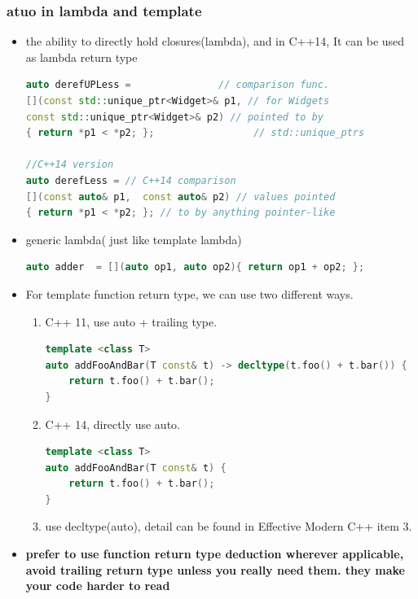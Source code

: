 \documentclass[a4paper,12pt,twoside]{book}
\begin{document}
\subsubsection{atuo in lambda and template}
\begin{itemize}
	\item the ability to directly hold closures(lambda), and in C++14, It can be used as lambda return type
\begin{lstlisting}[frame=single, language=c++]
auto derefUPLess =               // comparison func.
[](const std::unique_ptr<Widget>& p1, // for Widgets
const std::unique_ptr<Widget>& p2) // pointed to by
{ return *p1 < *p2; };                 // std::unique_ptrs
	
//C++14 version
auto derefLess = // C++14 comparison
[](const auto& p1,  const auto& p2) // values pointed
{ return *p1 < *p2; }; // to by anything pointer-like
	\end{lstlisting}
	
		\item generic lambda( just like template lambda)
\begin{lstlisting}[frame=single, language=c++]
auto adder  = [](auto op1, auto op2){ return op1 + op2; };
\end{lstlisting}
	
\item For template function return type, we can use two different ways.
\begin{enumerate}
	\item C++ 11, use auto + trailing type.
\begin{lstlisting}[frame=single, language=c++]
template <class T>
auto addFooAndBar(T const& t) -> decltype(t.foo() + t.bar()) {
	return t.foo() + t.bar();
}
\end{lstlisting}
	\item C++ 14, directly use auto.
\begin{lstlisting}[frame=single, language=c++]
template <class T>
auto addFooAndBar(T const& t) {
	return t.foo() + t.bar();
}
\end{lstlisting}
	\item use decltype(auto), detail can be found in Effective Modern C++ item 3.
\end{enumerate}
	
	\item \textbf{prefer to use function return type deduction wherever applicable, avoid trailing return type unless you really need them. they make your code harder to read}
	
\end{itemize}
\end{document}
